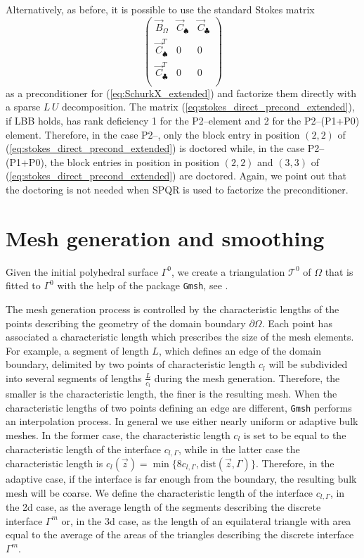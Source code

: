 Alternatively, as before, it is possible to use the standard Stokes matrix
\begin{equation}\label{eq:stokes_direct_precond_extended}
\begin{pmatrix}
\vec B_\Omega & \vec C_\spadesuit & \vec C_\clubsuit \\
\vec C^T_\spadesuit & 0 & 0 \\
\vec C^T_\clubsuit & 0 & 0 \\
\end{pmatrix}
\end{equation}
as a preconditioner for (\ref{eq:SchurkX_extended}) and factorize them directly
with a sparse $L\,U$ decomposition. The matrix
(\ref{eq:stokes_direct_precond_extended}), if LBB holds, has rank deficiency 1
for the P2--\pdg element and 2 for the P2--(P1+P0) element. Therefore, in the
case P2--\pdg, only the block entry in position $(2,2)$ of
(\ref{eq:stokes_direct_precond_extended}) is doctored while, in the case
P2--(P1+P0), the block entries in position in position $(2,2)$ and $(3,3)$ of
(\ref{eq:stokes_direct_precond_extended}) are doctored. Again, we point out
that the doctoring is not needed when SPQR is used to factorize the
preconditioner.

\section{Mesh generation and smoothing}\label{sec:stokes_smoothing}
Given the initial polyhedral surface $\Gamma^0$, we create a triangulation
$\mathcal{T}^0$ of $\Omega$ that is fitted to $\Gamma^0$ with the help of the
package \verb|Gmsh|, see \cite{GeuzaineR09}.

The mesh generation process is controlled by the characteristic lengths of the
points describing the geometry of the domain boundary $\partial\Omega$. Each
point has associated a characteristic length which prescribes the size of the
mesh elements. For example, a segment of length $L$, which defines an edge of
the domain boundary, delimited by two points of characteristic length $c_l$ will
be subdivided into several segments of lengths $\frac{L}{c_l}$ during the mesh
generation. Therefore, the smaller is the characteristic length, the finer is
the resulting mesh. When the characteristic lengths of two points defining an
edge are different, \verb|Gmsh| performs an interpolation process. In general we
use either nearly uniform or adaptive bulk meshes. In the former case, the
characteristic length $c_l$ is set to be equal to the characteristic length of
the interface $c_{l,\Gamma}$, while in the latter case the characteristic
length is $c_l(\vec z)=\min\{8c_{l,\Gamma},\mbox{dist}(\vec z,\Gamma)\}$.
Therefore, in the adaptive case, if the interface is far enough from the
boundary, the resulting bulk mesh will be coarse. We define the characteristic
length of the interface $c_{l,\Gamma}$, in the 2d case, as the average length
of the segments describing the discrete interface $\Gamma^m$ or, in the 3d
case, as the length of an equilateral triangle with area equal to the average
of the areas of the triangles describing the discrete interface $\Gamma^m$.

